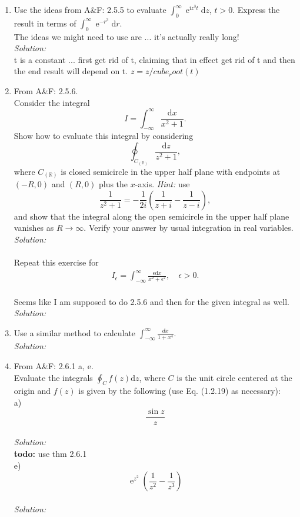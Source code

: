 \documentclass[10pt]{amsart}
\newcommand{\D}{\mathrm{d}}
\newcommand{\I}{\mathrm{i}}
\DeclareMathOperator{\E}{e}
\theoremstyle{nonumberplain}
\begin{document}
\begin{enumerate}[label={\bf {\arabic*}:}]
\item Use the ideas from A\&F: 2.5.5 to evaluate $\int_0^\infty \E^{\I
    z^3 t} \D z$, $t > 0$.  Express the result in terms of $\int_0^\infty \E^{-
    r^3} \D r$. \\
The ideas we might need to use are ... it's actually really long! \\
\textit{Solution:}\\
t is a constant ... first get rid of t, claiming that in effect get rid of t and then the end result will depend on t. $z = z/cube_root(t)$

\item From A\&F: 2.5.6. \\
Consider the integral $$I = \int_{-\infty}^{\infty} \frac{\D x}{x^2 + 1}.$$
Show how to evaluate this integral by considering
$$\oint_{C_{(\mathbb R)}} \frac{\D z}{z^2 + 1},$$
where $C_{(\mathbb R)}$ is closed semicircle in the upper half plane with endpoints at $(-R, 0)$ and $(R, 0)$ plus the $x$-axis.
\textit{Hint:} use
$$\frac{1}{z^2 + 1} = -\frac{1}{2i}\left(\frac{1}{z + i} - \frac{1}{z - i}\right),$$
and show that the integral along the open semicircle in the upper half plane vanishes as $R \rightarrow \infty$.
Verify your answer by usual integration in real variables.
\textit{Solution:}\\
\\

\noindent
Repeat this exercise for
  \begin{align*}
    I_\epsilon = \int_{-\infty}^\infty \frac{\epsilon \D x}{x^2 +
    \epsilon^2}, \quad \epsilon > 0.
  \end{align*}\\
Seems like I am supposed to do 2.5.6 and then for the given integral as well. \\
\textit{Solution:}\\
\item Use a similar method to calculate
  $\int_{-\infty}^{\infty} \frac{d x}{1+x^4}$. \\
\textit{Solution:}\\

\item From A\&F: 2.6.1 a, e.\\
Evaluate the integrals $\oint_C f(z) \D z$, where $C$ is the unit circle centered at the origin and $f(z)$ is given by the following (use Eq. (1.2.19) as necessary): \\
a)
$$
\frac{\sin z}{z}
$$
\\
\textit{Solution:}\\
\textbf{todo:} use thm 2.6.1 \\
e)
$$
\E^{z^2}\left(\frac{1}{z^2} - \frac{1}{z^3}\right)
$$
\\
\textit{Solution:}\\
\end{enumerate}
\end{document}
